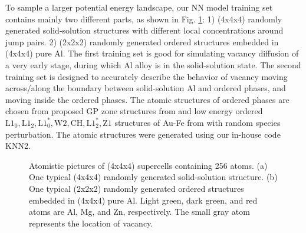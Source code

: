 To sample a larger potential energy landscape, our \ac{NN} model training set contains mainly two different parts, as shown in Fig. \ref{Chap:Al/Vac:fig:atomic_illu}: 1) (4x4x4) randomly generated solid-solution structures with different local concentrations around jump pairs. 2) (2x2x2) randomly generated ordered structures embedded in (4x4x4) pure Al. The first training set is good for simulating vacancy diffusion of a very early stage, during which Al alloy is in the solid-solution state. The second training set is designed to accurately describe the behavior of vacancy moving across/along the boundary between solid-solution Al and ordered phases, and moving inside the ordered phases. The atomic structures of ordered phases are chosen from proposed GP zone structures from \cite{berg2001gp} and low energy ordered $\text{L1}_\text{0}, \text{L1}_\text{2}, \text{L1}_\text{0}^*, \text{W2}, \text{CH}, \text{L1}_\text{2}^*, \text{Z1}$ structures of Au-Fe from \cite{zhuravlev2017phase} with random species perturbation. The atomic  structures were generated using our in-house code KNN2. \cite{Zhang2020KNN2}


\begingroup
\begin{figure}[!ht]
  \centering
\caption[Atomistic pictures of (4x4x4) supercells containing 256 atoms.]{Atomistic pictures of (4x4x4) supercells containing 256 atoms. (a) One typical (4x4x4) randomly generated solid-solution structure. (b) One typical (2x2x2) randomly generated ordered structures embedded in (4x4x4) pure Al. Light green, dark green, and red atoms are Al, Mg, and Zn, respectively. The small gray atom represents the location of vacancy.}
\label{Chap:Al/Vac:fig:atomic_illu}
\end{figure}
\endgroup


